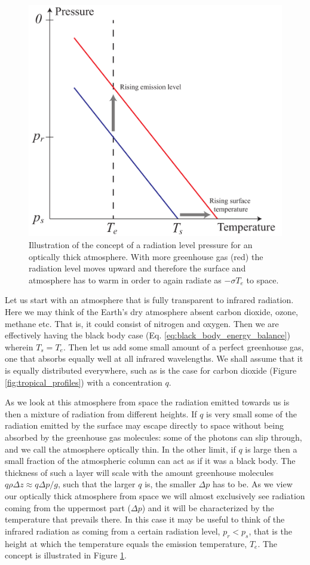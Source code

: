 \documentclass[12pt]{book}
\begin{document}
\begin{figure}
\begin{center}
\includegraphics[width=8 cm]{../illustrations/Gaseous_atmosphere_radiation_level}
\end{center}
\caption{ Illustration of the concept of a radiation level pressure for an optically thick atmosphere. With more greenhouse gas (red) the radiation level moves upward and therefore the surface and atmosphere has to warm in order to again radiate as $-\sigma T_e$ to space.   } 
\label{fig:radiation_level}
\end{figure}

Let us start with an atmosphere that is fully transparent to infrared radiation. Here we may think of the Earth's dry atmosphere absent carbon dioxide, ozone, methane etc. That is, it could consist of nitrogen and oxygen. Then we are effectively having the black body case (Eq. \ref{eq:black_body_energy_balance}) wherein $T_s = T_e$. Then let us add some small amount of a perfect greenhouse gas, one that absorbs equally well at all infrared wavelengths. We shall assume that it is equally distributed everywhere, such as is the case for carbon dioxide (Figure \ref{fig:tropical_profiles}) with a concentration $q$. 

As we look at this atmosphere from space the radiation emitted towards us is then  a mixture of radiation from different heights. If $q$ is very small some of the radiation emitted by the surface may escape directly to space without being absorbed by the greenhouse gas molecules: some of the photons can slip through, and we call the atmosphere optically thin. In the other limit, if $q$ is large then a small fraction of the atmospheric column can act as if it was a black body. The thickness of such a layer will scale with the amount greenhouse molecules $q\rho \Delta z \approx q \Delta p/g$, such that the larger $q$ is, the smaller $\Delta p$ has to be. As we view our optically thick atmosphere from space we will almost exclusively see radiation coming from the uppermost part ($\Delta p$) and it will be characterized by the temperature that prevails there. In this case it may be useful to think of the infrared radiation as coming from a certain radiation level, $p_r < p_s$, that is the height at which the temperature equals the emission temperature, $T_e$. The concept is illustrated in Figure \ref{fig:radiation_level}.
\end{document}
